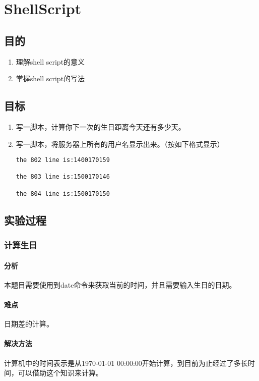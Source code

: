 \chapter{ShellScript}
\section{目的}
\begin{enumerate}
\item
理解shell script的意义
\item
掌握shell script的写法
\end{enumerate}
\section{目标}
\begin{enumerate}
\item
写一脚本，计算你下一次的生日距离今天还有多少天。
\item
写一脚本，将服务器上所有的用户名显示出来。（按如下格式显示）
\begin{verbatim}
the 802 line is:1400170159

the 803 line is:1500170146

the 804 line is:1500170150
\end{verbatim}
\end{enumerate}
\section{实验过程}
\subsection{计算生日}
\subsubsection{分析}
本题目需要使用到date命令来获取当前的时间，并且需要输入生日的日期。
\subsubsection{难点}
日期差的计算。
\subsubsection{解决方法}
计算机中的时间表示是从1970-01-01 00:00:00开始计算，到目前为止经过了多长时间，可以借助这个知识来计算。

